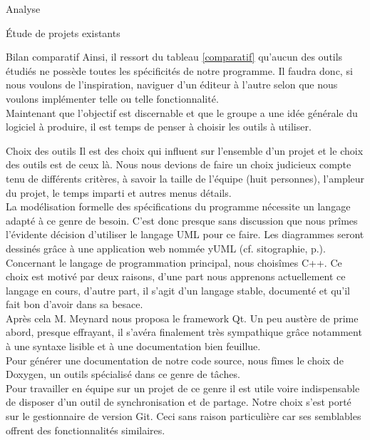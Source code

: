 \documentclass[a4paper, 12pt]{report}
\begin{document}
\begin{part}{Analyse}
\begin{chapter}{Étude de projets existants}
\begin{section}{Bilan comparatif}
				Ainsi, il ressort du tableau \ref{comparatif} qu'aucun des outils étudiés ne possède toutes les spécificités de notre programme.
				Il faudra donc, si nous voulons de l'inspiration, naviguer d'un éditeur à l'autre selon que nous voulons implémenter telle ou
				telle fonctionnalité.\\


				Maintenant que l'objectif est discernable et que le groupe a une idée générale du logiciel à produire, il est temps de
				penser à choisir les outils à utiliser.
			\end{section}
		\end{chapter}
		\begin{chapter}{Choix des outils}
			Il est des choix qui influent sur l'ensemble d'un projet et le choix des outils est de ceux là.
			Nous nous devions de faire un choix judicieux compte tenu de différents critères, à savoir la taille de l'équipe (huit personnes),
			l'ampleur du projet, le temps imparti et autres menus détails.\\


			La modélisation formelle des spécifications du programme nécessite un langage adapté à ce genre de besoin. C'est donc presque
			sans discussion que nous prîmes l'évidente décision d'utiliser le langage UML pour ce faire.
			Les diagrammes seront dessinés grâce à une application web nommée yUML (cf. sitographie, p.\pageref{sitographie}).\\


			Concernant le langage de programmation principal, nous choisîmes C++. Ce choix est motivé par deux raisons, d'une part nous apprenons
			actuellement ce langage en cours, d'autre part, il s'agit d'un langage stable, documenté et qu'il fait bon d'avoir dans sa besace.\\


			Après cela M. Meynard nous proposa le framework \gls{Qt}. Un peu austère de prime abord, presque effrayant, il s'avéra finalement très
			sympathique grâce notamment à une syntaxe lisible et à une documentation bien feuillue.\\

			Pour générer une documentation de notre code source, nous fîmes le choix de \gls{Doxygen}, un outils spécialisé dans ce genre
			de tâches.\\


			Pour travailler en équipe sur un projet de ce genre il est utile voire indispensable de disposer d'un outil de synchronisation et
			de partage. Notre choix s'est porté sur le gestionnaire de version \gls{Git}. Ceci sans raison particulière car ses semblables offrent
			des fonctionnalités similaires.\\



\end{chapter}
\end{part}
\end{document}
